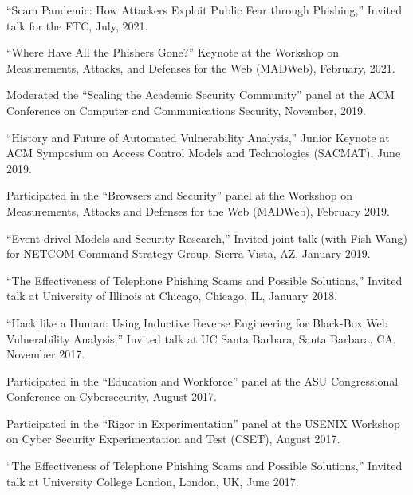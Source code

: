 \documentclass[11pt,letterpaper,sans]{moderncv}
\begin{document}
\begin{etaremune}

  \item ``Scam Pandemic: How Attackers Exploit Public Fear through Phishing,'' Invited talk for the FTC, July, 2021.

  \item ``Where Have All the Phishers Gone?'' Keynote at the Workshop on Measurements, Attacks, and Defenses for the Web (MADWeb), February, 2021.

  \item Moderated the ``Scaling the Academic Security Community'' panel at the ACM Conference on Computer and Communications Security, November, 2019.

  \item ``History and Future of Automated Vulnerability Analysis,'' Junior Keynote at ACM Symposium on Access Control Models and Technologies (SACMAT), June 2019.

  \item Participated in the ``Browsers and Security'' panel at the Workshop on Measurements, Attacks and Defenses for the Web (MADWeb), February 2019.

  \item ``Event-drivel Models and Security Research,'' Invited joint talk (with Fish Wang) for NETCOM Command Strategy Group, Sierra Vista, AZ, January 2019.

  \item ``The Effectiveness of Telephone Phishing Scams and Possible Solutions,''
    Invited talk at University of Illinois at Chicago, Chicago, IL, January 2018.

  \item ``Hack like a Human: Using Inductive Reverse Engineering for Black-Box Web Vulnerability Analysis,'' Invited talk at UC Santa Barbara, Santa Barbara, CA, November 2017.

  \item Participated in the ``Education and Workforce'' panel at the
    ASU Congressional Conference on Cybersecurity, August 2017.

  \item Participated in the ``Rigor in Experimentation'' panel at the
    USENIX Workshop on Cyber Security Experimentation and Test (CSET),
    August 2017.

  \item ``The Effectiveness of Telephone Phishing Scams and Possible Solutions,''
    Invited talk at University College London, London, UK, June
    2017.


\end{etaremune}
\end{document}
